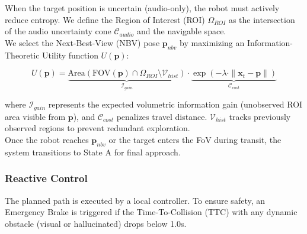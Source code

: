 \documentclass[
]{article}
\begin{document}
When the target position is uncertain (audio-only), the robot must
actively reduce entropy. We define the Region of Interest (ROI)
\(\Omega_{ROI}\) as the intersection of the audio uncertainty cone
\(\mathcal{C}_{audio}\) and the navigable space.\\
We select the Next-Best-View (NBV) pose \(\mathbf{p}_{nbv}\) by
maximizing an Information-Theoretic Utility function \(U(\mathbf{p})\):

\[U(\mathbf{p}) = \underbrace{\text{Area}(\text{FOV}(\mathbf{p}) \cap \Omega_{ROI} \setminus \mathcal{V}_{hist})}_{\mathcal{I}_{gain}} \cdot \underbrace{\exp(-\lambda \cdot \|\mathbf{x}_t - \mathbf{p} \|)}_{\mathcal{C}_{cost}}\]

where \(\mathcal{I}_{gain}\) represents the expected volumetric
information gain (unobserved ROI area visible from \(\mathbf{p}\)), and
\(\mathcal{C}_{cost}\) penalizes travel distance. \(\mathcal{V}_{hist}\)
tracks previously observed regions to prevent redundant exploration.\\
Once the robot reaches \(\mathbf{p}_{nbv}\) or the target enters the FoV
during transit, the system transitions to State A for final approach.

\subsubsection{Reactive Control}\label{reactive-control}

The planned path is executed by a local controller. To ensure safety, an
Emergency Brake is triggered if the Time-To-Collision (TTC) with any
dynamic obstacle (visual or hallucinated) drops below 1.0s.
\end{document}
